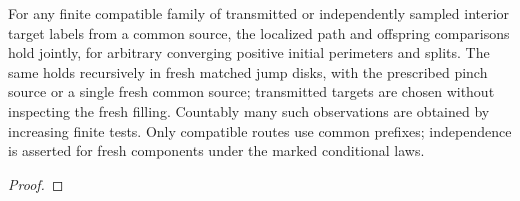 \begin{proposition}\label{cut:marked-targets}
For any finite compatible family of transmitted or independently sampled
interior target labels from a common source, the localized path and offspring
comparisons hold jointly, for arbitrary converging positive initial
perimeters and splits.  The same holds recursively in fresh matched jump
disks, with the prescribed pinch source or a single fresh common source;
transmitted targets are chosen without inspecting the fresh filling.
Countably many such observations are obtained by increasing finite tests.
Only compatible routes use common prefixes; independence is asserted for
fresh components under the marked conditional laws.
\end{proposition}
\begin{proof}\leavevmode


\end{proof}
